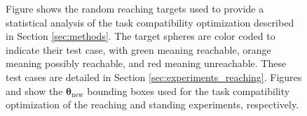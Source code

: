 \documentclass[12pt,a4paper,twoside]{article}
\newcommand{\bs}[1]{\boldsymbol{#1}}
\newcommand{\obj}{\bs{\theta}}
\begin{document}
\begin{figure}[!h]
	\begin{minipage}[c]{0.6\textwidth}
	\centering
  	\end{minipage}\hfill
  \begin{minipage}[c]{0.37\textwidth}
      \setlength{\belowcaptionskip}{-12pt}
    \caption{Figure \protect{} shows the random reaching targets used to provide a statistical analysis of the task compatibility optimization described in Section \ref{sec:methods}. The target spheres are color coded to indicate their test case, with green meaning reachable, orange meaning possibly reachable, and red meaning unreachable. These test cases are detailed in Section \ref{sec:experiments_reaching}. Figures \protect{} and \protect{} show the $\obj_{\text{new}}$ bounding boxes used for the task compatibility optimization of the reaching and standing experiments, respectively.}
    \label{fig:experiments_figures}
  \end{minipage}
\end{figure}
\end{document}
